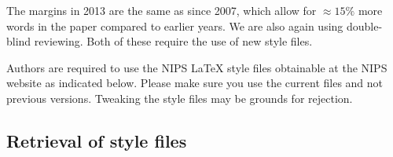 \documentclass{article} %
\begin{document}
The margins in 2013 are the same as since 2007, which allow for $\approx 15\%$
more words in the paper compared to earlier years. We are also again using 
double-blind reviewing. Both of these require the use of new style files.

Authors are required to use the NIPS \LaTeX{} style files obtainable at the
NIPS website as indicated below. Please make sure you use the current files and
not previous versions. Tweaking the style files may be grounds for rejection.








\subsection{Retrieval of style files}
\end{document}
